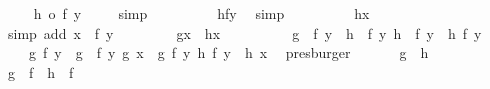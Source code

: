 \begin{isabellebody}
\ \isamarkupfalse%
\ {\isachardoublequoteopen}{\isachardot}{\isachardot}{\isachardot}\ {\isacharequal}\ {\isacharparenleft}h\ o\ f{\isacharparenright}\ {\isacharparenleft}y{\isacharparenright}{\isachardoublequoteclose}\ \isamarkupfalse%
\ {}\ \isamarkupfalse%
\ simp\isanewline
\ \ \ \ \isamarkupfalse%
\ \isamarkupfalse%
\ {\isachardoublequoteopen}{\isachardot}{\isachardot}{\isachardot}\ {\isacharequal}\ h{\isacharparenleft}f{\isacharparenleft}y{\isacharparenright}{\isacharparenright}{\isachardoublequoteclose}\ \isamarkupfalse%
\ simp\isanewline
\ \ \ \ \isamarkupfalse%
\ \isamarkupfalse%
\ {\isachardoublequoteopen}{\isachardot}{\isachardot}{\isachardot}\ {\isacharequal}\ h{\isacharparenleft}x{\isacharparenright}{\isachardoublequoteclose}\ \isamarkupfalse%
\ {}\ \ \ \isamarkupfalse%
\ {\isacharparenleft}simp\ add{\isacharcolon}\ {\isacartoucheopen}x\ {\isacharequal}\ f\ y{\isacartoucheclose}{\isacharparenright}\isanewline
\ \ \ \ \isamarkupfalse%
\ \isamarkupfalse%
\ {\isachardoublequoteopen}\ g{\isacharparenleft}x{\isacharparenright}\ {\isacharequal}\ h{\isacharparenleft}x{\isacharparenright}\ {\isachardoublequoteclose}\ \isanewline
\ \ \ \ \ \ \isamarkupfalse%
\ {\isacartoucheopen}{\isacharparenleft}g\ {\isasymcirc}\ f{\isacharparenright}\ y\ {\isacharequal}\ {\isacharparenleft}h\ {\isasymcirc}\ f{\isacharparenright}\ y{\isacartoucheclose}\ {\isacartoucheopen}{\isacharparenleft}h\ {\isasymcirc}\ f{\isacharparenright}\ y\ {\isacharequal}\ h\ {\isacharparenleft}f\ y{\isacharparenright}{\isacartoucheclose}\isanewline
\ \ \ \ {\isacartoucheopen}g\ {\isacharparenleft}f\ y{\isacharparenright}\ {\isacharequal}\ {\isacharparenleft}g\ {\isasymcirc}\ f{\isacharparenright}\ y{\isacartoucheclose}\ {\isacartoucheopen}g\ x\ {\isacharequal}\ g\ {\isacharparenleft}f\ y{\isacharparenright}{\isacartoucheclose}\ {\isacartoucheopen}h\ {\isacharparenleft}f\ y{\isacharparenright}\ {\isacharequal}\ h\ x{\isacartoucheclose}\ \isamarkupfalse%
\ presburger\isanewline
\ \ \isamarkupfalse%
\isanewline
{}\isamarkupfalse%
\isanewline
\ \ \isamarkupfalse%
\ {\isachardoublequoteopen}g\ {\isacharequal}\ h{\isachardoublequoteclose}\ \isanewline
\ \ \isamarkupfalse%
\ {\isachardoublequoteopen}g\ {\isasymcirc}\ f\ {\isacharequal}\ h\ {\isasymcirc}\ f{\isachardoublequoteclose}\isanewline

\end{isabellebody}
